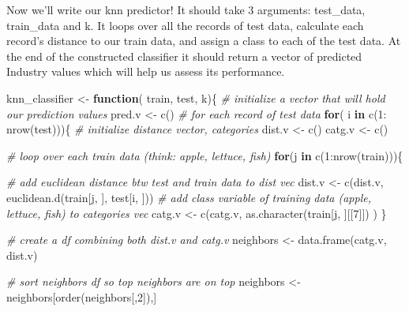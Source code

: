 \documentclass[
]{article}
\newenvironment{Shaded}{\begin{snugshade}}{\end{snugshade}}
\newcommand{\CommentTok}[1]{\textcolor[rgb]{0.56,0.35,0.01}{\textit{#1}}}
\newcommand{\ControlFlowTok}[1]{\textcolor[rgb]{0.13,0.29,0.53}{\textbf{#1}}}
\newcommand{\DecValTok}[1]{\textcolor[rgb]{0.00,0.00,0.81}{#1}}
\newcommand{\FunctionTok}[1]{\textcolor[rgb]{0.00,0.00,0.00}{#1}}
\newcommand{\NormalTok}[1]{#1}
\newcommand{\OtherTok}[1]{\textcolor[rgb]{0.56,0.35,0.01}{#1}}
\newcommand{\SpecialCharTok}[1]{\textcolor[rgb]{0.00,0.00,0.00}{#1}}
\begin{document}
Now we'll write our knn predictor! It should take 3 arguments:
test\_data, train\_data and k. It loops over all the records of test
data, calculate each record's distance to our train data, and assign a
class to each of the test data. At the end of the constructed classifier
it should return a vector of predicted Industry values which will help
us assess its performance.

\begin{Shaded}
\begin{Highlighting}[]
\NormalTok{knn\_classifier }\OtherTok{\textless{}{-}} \ControlFlowTok{function}\NormalTok{( train, test, k)\{}
  \CommentTok{\# initialize a vector that will hold our prediction values}
\NormalTok{  pred.v }\OtherTok{\textless{}{-}} \FunctionTok{c}\NormalTok{() }
  \CommentTok{\# for each record of test data }
  \ControlFlowTok{for}\NormalTok{( i }\ControlFlowTok{in} \FunctionTok{c}\NormalTok{(}\DecValTok{1}\SpecialCharTok{:} \FunctionTok{nrow}\NormalTok{(test)))\{}
    \CommentTok{\# initialize distance vector, categories}
\NormalTok{    dist.v }\OtherTok{\textless{}{-}} \FunctionTok{c}\NormalTok{()}
\NormalTok{    catg.v }\OtherTok{\textless{}{-}} \FunctionTok{c}\NormalTok{()}

      
      \CommentTok{\# loop over each train data (think: apple, lettuce, fish)}
      \ControlFlowTok{for}\NormalTok{(j }\ControlFlowTok{in} \FunctionTok{c}\NormalTok{(}\DecValTok{1}\SpecialCharTok{:}\FunctionTok{nrow}\NormalTok{(train)))\{}
        
        \CommentTok{\# add euclidean distance btw test and train data to dist vec}
\NormalTok{        dist.v }\OtherTok{\textless{}{-}} \FunctionTok{c}\NormalTok{(dist.v, }\FunctionTok{euclidean.d}\NormalTok{(train[j, ], test[i, ]))}
        \CommentTok{\# add class variable of training data (apple, lettuce, fish) to categories vec}
\NormalTok{        catg.v }\OtherTok{\textless{}{-}} \FunctionTok{c}\NormalTok{(catg.v, }\FunctionTok{as.character}\NormalTok{(train[j, ][[}\DecValTok{7}\NormalTok{]]) )}
\NormalTok{      \}}
    
    \CommentTok{\# create a df combining both dist.v and catg.v}
\NormalTok{    neighbors }\OtherTok{\textless{}{-}} \FunctionTok{data.frame}\NormalTok{(catg.v, dist.v)}
    
    \CommentTok{\# sort neighbors df so top neighbors are on top}
\NormalTok{    neighbors }\OtherTok{\textless{}{-}}\NormalTok{ neighbors[}\FunctionTok{order}\NormalTok{(neighbors[,}\DecValTok{2}\NormalTok{]),]}
    

\end{Highlighting}
\end{Shaded}
\end{document}
